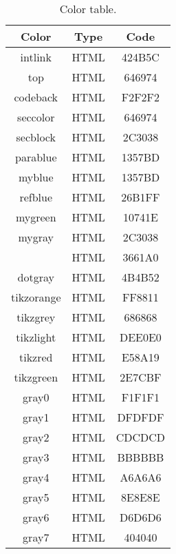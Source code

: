 \documentclass[book]{scrbook}
\begin{document}
\begin{table}[ht]
  \centering\ttfamily
  \begin{tabular}{ccc}
    \toprule
    {\normalfont Color} & {\normalfont Type} & {\normalfont Code} \\
    \midrule
    \rowcolor{intlink}    {intlink} & {HTML} & {424B5C} \\
    \rowcolor{top}        {top} & {HTML} & {646974} \\
    \rowcolor{codeback}   {codeback} & {HTML} & {F2F2F2} \\
    \rowcolor{seccolor}   {seccolor} & {HTML} & {646974} \\
    \rowcolor{secblock}   {secblock} & {HTML} & {2C3038} \\
    \rowcolor{parablue}   {parablue} & {HTML} & {1357BD} \\
    \rowcolor{myblue}     {myblue} & {HTML} & {1357BD} \\
    \rowcolor{refblue}    {refblue} & {HTML} & {26B1FF} \\
    \rowcolor{mygreen}    {mygreen} & {HTML} & {10741E} \\
    \rowcolor{mygray}     {mygray} & {HTML} & {2C3038} \\
    \rowcolor{mylightgray}{mylightgray} & {HTML} & {3661A0} \\
    \rowcolor{dotgray}    {dotgray} & {HTML} & {4B4B52} \\
    \rowcolor{tikzorange} {tikzorange} & {HTML} & {FF8811} \\
    \rowcolor{tikzgrey}   {tikzgrey} & {HTML} & {686868} \\
    \rowcolor{tikzlight}  {tikzlight} & {HTML} & {DEE0E0} \\
    \rowcolor{tikzred}    {tikzred} & {HTML} & {E58A19} \\
    \rowcolor{tikzgreen}  {tikzgreen} & {HTML} & {2E7CBF} \\
    \rowcolor{gray0}      {gray0} & {HTML} & {F1F1F1} \\
    \rowcolor{gray1}      {gray1} & {HTML} & {DFDFDF} \\
    \rowcolor{gray2}      {gray2} & {HTML} & {CDCDCD} \\
    \rowcolor{gray3}      {gray3} & {HTML} & {BBBBBB} \\
    \rowcolor{gray4}      {gray4} & {HTML} & {A6A6A6} \\
    \rowcolor{gray5}      {gray5} & {HTML} & {8E8E8E} \\
    \rowcolor{gray6}      {gray6} & {HTML} & {D6D6D6} \\
    \rowcolor{gray7}      {gray7} & {HTML} & {404040} \\
    \bottomrule
  \end{tabular}
  \caption{Color table.}
  \label{tab:colors}
\end{table}
\end{document}
